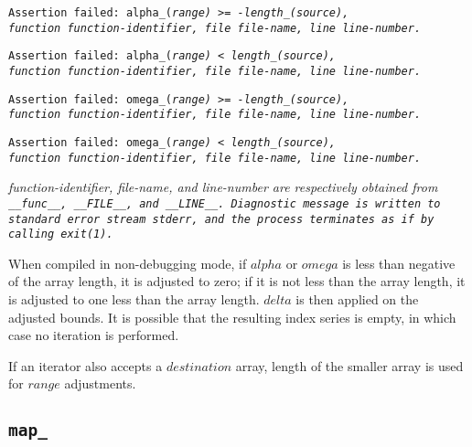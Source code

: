 \begin{center}
\tt{Assertion failed:} \tt{alpha_(}\it{range}\tt{) >= -length_(}\it{source}\tt{),}\\
\tt{function}
\it{function-identifier}\tt{, file}
\it{file-name}\tt{, line}
\it{line-number}\tt{.}\\
\end{center}

\begin{center}
\tt{Assertion failed:} \tt{alpha_(}\it{range}\tt{) < length_(}\it{source}\tt{),}\\
\tt{function}
\it{function-identifier}\tt{, file}
\it{file-name}\tt{, line}
\it{line-number}\tt{.}\\
\end{center}

\begin{center}
\tt{Assertion failed:} \tt{omega_(}\it{range}\tt{) >= -length_(}\it{source}\tt{),}\\
\tt{function}
\it{function-identifier}\tt{, file}
\it{file-name}\tt{, line}
\it{line-number}\tt{.}\\
\end{center}

\begin{center}
\tt{Assertion failed:} \tt{omega_(}\it{range}\tt{) < length_(}\it{source}\tt{),}\\
\tt{function}
\it{function-identifier}\tt{, file}
\it{file-name}\tt{, line}
\it{line-number}\tt{.}\\
\end{center}

\it{function-identifier}, \it{file-name}, and \it{line-number} are
respectively obtained from \tt{__func__}, \tt{__FILE__}, and \tt{__LINE__}.
Diagnostic message is written to standard error stream \tt{stderr},
and the process terminates as if by calling \tt{exit(1)}.

When compiled in non-debugging mode, if $alpha$ or $omega$ is less than
negative of the array length, it is adjusted to zero; if it is not less
than the array length, it is adjusted to one less than the array length.
$delta$ is then applied on the adjusted bounds.
It is possible that the resulting index series is
empty, in which case no iteration is performed.

\note If an iterator also accepts a $destination$ array,
length of the smaller array is used for $range$ adjustments.

\subsection{\tt{map_}}


